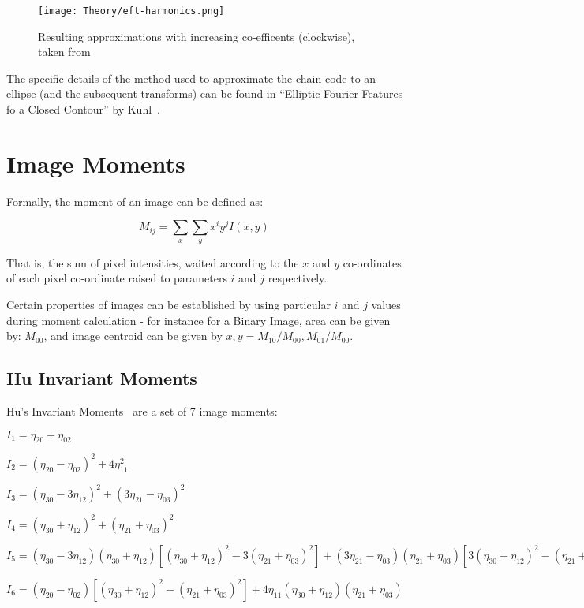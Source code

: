 \begin{figure}[H]
    \centering
    \texttt{[image: Theory/eft-harmonics.png]}
    \caption{Resulting approximations with increasing co-efficents (clockwise), taken from~\cite{kuhl1982elliptic}}
\end{figure}

The specific details of the method used to approximate the chain-code to an ellipse (and the subsequent transforms) can be found in ``Elliptic Fourier Features fo a Closed Contour'' by Kuhl~\cite{kuhl1982elliptic}.

\section{Image Moments}
Formally, the moment of an image can be defined as\cite{liao1996image}:

\begin{equation}
M_{ij} = \sum_x \sum_y x^i y^j I(x,y)\,\!
\end{equation}

That is, the sum of pixel intensities, waited according to the $x$ and $y$ co-ordinates of each pixel co-ordinate raised to parameters $i$ and $j$ respectively.

Certain properties of images can be established by using particular $i$ and $j$ values during moment calculation - for instance for a Binary Image, area can be given by: $M_{00}$, and image centroid can be given by ${x, y} = M_{10}/M_{00}, M_{01}/M_{00}$.


\subsection{Hu Invariant Moments}
\label{sec:hu}
Hu's Invariant Moments~\cite{hu1962visual} are a set of 7 image moments:

$I_1 = \eta_{20} + \eta_{02}$

$I_2 = (\eta_{20} - \eta_{02})^2 + 4\eta_{11}^2$

$I_3 = (\eta_{30} - 3\eta_{12})^2 + (3\eta_{21} - \eta_{03})^2$

$I_4 = (\eta_{30} + \eta_{12})^2 + (\eta_{21} + \eta_{03})^2$

$I_5 = (\eta_{30} - 3\eta_{12}) (\eta_{30} + \eta_{12})[ (\eta_{30} + \eta_{12})^2 - 3 (\eta_{21} + \eta_{03})^2] + (3 \eta_{21} - \eta_{03}) (\eta_{21} + \eta_{03})[ 3(\eta_{30} + \eta_{12})^2 -  (\eta_{21} + \eta_{03})^2]$

$I_6 =  (\eta_{20} - \eta_{02})[(\eta_{30} + \eta_{12})^2 - (\eta_{21} + \eta_{03})^2] + 4\eta_{11}(\eta_{30} + \eta_{12})(\eta_{21} + \eta_{03})$

